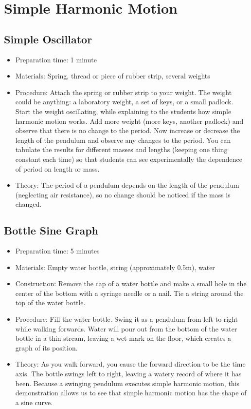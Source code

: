 \section{Simple Harmonic Motion}

\subsection{Simple Oscillator}
\begin{itemize}
\item{Preparation time: 1 minute}
\item{Materials: Spring, thread or piece of rubber strip, several weights}
\item{Procedure: Attach the spring or rubber strip to your weight. The weight could be anything: a laboratory weight, a set of keys, or a small padlock. Start the weight oscillating, while explaining to the students how simple harmonic motion works. Add more weight (more keys, another padlock) and observe that there is no change to the period. Now increase or decrease the length of the pendulum and observe any changes to the period. You can tabulate the results for different masses and lengths (keeping one thing constant each time) so that students can see experimentally the dependence of period on length or mass.}
\item{Theory: The period of a pendulum depends on the length of the pendulum (neglecting air resistance), so no change should be noticed if the mass is changed.}
\end{itemize}

\subsection{Bottle Sine Graph}
\begin{itemize}
\item{Preparation time: 5 minutes}
\item{Materials: Empty water bottle, string (approximately 0.5m), water}
\item{Construction: Remove the cap of a water bottle and make a small hole in the center of the bottom with a syringe needle or a nail. Tie a string around the top of the water bottle.}
\item{Procedure: Fill the water bottle. Swing it as a pendulum from left to right while walking forwards. Water will pour out from the bottom of the water bottle in a thin stream, leaving a wet mark on the floor, which creates a graph of its position.}
\item{Theory: As you walk forward, you cause the forward direction to be the time axis. The bottle swings left to right, leaving a watery record of where it has been. Because a swinging pendulum executes simple harmonic motion, this demonstration allows us to see that simple harmonic motion has the shape of a sine curve.}
\end{itemize}

